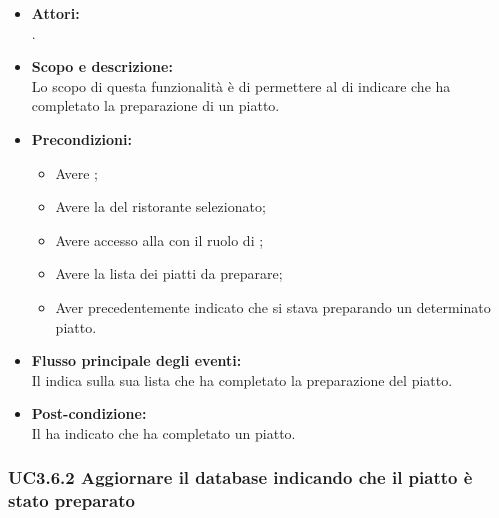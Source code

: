 \begin{itemize}
	\item \textbf{Attori:}
	\\.
	\item \textbf{Scopo e descrizione:} 
	\\Lo scopo di questa funzionalità è di permettere al  di indicare che ha completato la preparazione di un piatto.
	\item \textbf{Precondizioni:}
	\begin{itemize}
		\item Avere ;
		\item Avere la  del ristorante selezionato;
		\item Avere accesso alla  con il ruolo di ;
		\item Avere la lista dei piatti da preparare;
		\item Aver precedentemente indicato che si stava preparando un determinato piatto.
	\end{itemize}
	\item \textbf{Flusso principale degli eventi:}
	\\Il {} indica sulla sua lista che ha completato la preparazione del piatto.
	\item \textbf{Post-condizione:}
	\\Il {} ha indicato che ha completato un piatto.
\end{itemize}

\subsubsection{UC3.6.2 Aggiornare il database indicando che il piatto è stato preparato} \label{UC3.6.2}

